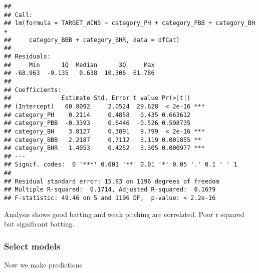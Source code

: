 \documentclass[
]{article}
\begin{document}
\begin{verbatim}
## 
## Call:
## lm(formula = TARGET_WINS ~ category_PH + category_PBB + category_BH + 
##     category_BBB + category_BHR, data = dfCat)
## 
## Residuals:
##     Min      1Q  Median      3Q     Max 
## -68.963  -9.135   0.638  10.306  61.786 
## 
## Coefficients:
##              Estimate Std. Error t value Pr(>|t|)    
## (Intercept)   60.8092     2.0524  29.628  < 2e-16 ***
## category_PH    0.2114     0.4858   0.435 0.663612    
## category_PBB  -0.3393     0.6446  -0.526 0.598735    
## category_BH    3.8127     0.3891   9.799  < 2e-16 ***
## category_BBB   2.2187     0.7112   3.119 0.001855 ** 
## category_BHR   1.4053     0.4252   3.305 0.000977 ***
## ---
## Signif. codes:  0 '***' 0.001 '**' 0.01 '*' 0.05 '.' 0.1 ' ' 1
## 
## Residual standard error: 15.83 on 1196 degrees of freedom
## Multiple R-squared:  0.1714, Adjusted R-squared:  0.1679 
## F-statistic: 49.46 on 5 and 1196 DF,  p-value: < 2.2e-16
\end{verbatim}

Analysis shows good batting and weak pitching are correlated. Poor r
squared but significant batting.

\hypertarget{select-models}{%
\subsubsection{Select models}\label{select-models}}

Now we make predictions
\end{document}
